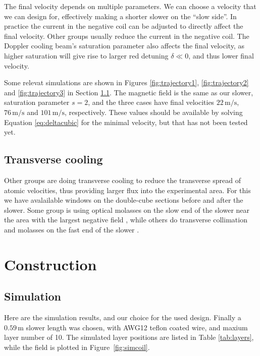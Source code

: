 \documentclass[12pt,a4paper]{article}
\newcommand{\unit}[1]{\ensuremath{\, \mathrm{#1}}}
\begin{document}
The final velocity depends on multiple parameters. We can choose a velocity that we can design for, effectively making a shorter slower on the ``slow side''. In practice the current in the negative coil can be adjusted to directly affect the final velocity. Other groups usually reduce the current in the negative coil. The Doppler cooling beam's saturation parameter also affects the final velocity, as higher saturation will give rise to larger red detuning $\delta \ll 0$, and thus lower final velocity.

Some relevat simulations are shown in Figures \ref{fig:trajectory1}, \ref{fig:trajectory2} and \ref{fig:trajectory3} in Section \ref{seq:sim}. The magnetic field is the same as our slower, saturation parameter $s=2$, and the three cases have final velocities $22\unit{m/s}$, $76\unit{m/s}$ and $101\unit{m/s}$, respectively. These values should be available by solving Equation \ref{eq:deltacubic} for the minimal velocity, but that has not been tested yet.

\subsection{Transverse cooling}

Other groups are doing transverse cooling to reduce the transverse spread of atomic velocities, thus providing larger flux into the experimental area. For this we have avalailable windows on the double-cube sections before and after the slower. Some group is using optical molasses on the slow end of the slower  near the area with the largest negative field \cite{Joffe1993}, while others do transverse collimation and molasses on the fast end of the slower \cite{Slowe2005}.


\section{Construction}

\subsection{Simulation}
\label{seq:sim}

Here are the simulation results, and our choice for the used design.
Finally a $0.59\unit{m}$ slower length was chosen, with AWG12 teflon coated wire, and maxium layer number of 10. The simulated layer positions are listed in Table \ref{tab:layers}, while the field is plotted in Figure~\ref{fig:simcoil}.
\end{document}
